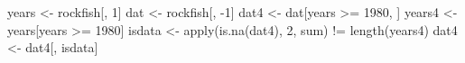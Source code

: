 \begin{Schunk}
\begin{Sinput}
 years <- rockfish[, 1]
 dat <- rockfish[, -1]
 dat4 <- dat[years >= 1980, ]
 years4 <- years[years >= 1980]
 isdata <- apply(is.na(dat4), 2, sum) != length(years4)
 dat4 <- dat4[, isdata]
\end{Sinput}
\end{Schunk}

